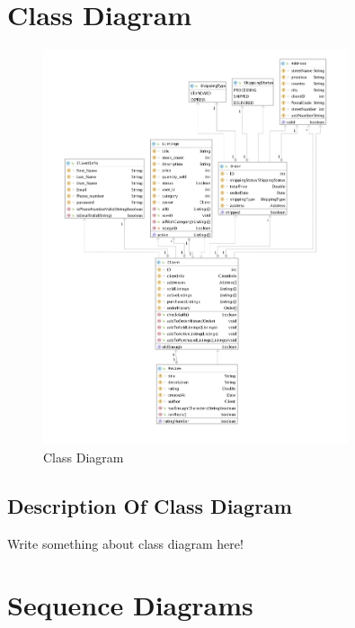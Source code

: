 \documentclass[11pt]{article}
\begin{document}
\section{Class Diagram}
\begin{figure}[ht!]
    \centering
    \includegraphics[width=0.8\textwidth]{Diagrams/Class/class_diagram.png} %
    \caption{Class Diagram}
    \label{fig: Class diagram}
\end{figure}

\subsection{Description Of Class Diagram}
Write something about class diagram here!

\section{Sequence Diagrams}
\end{document}
